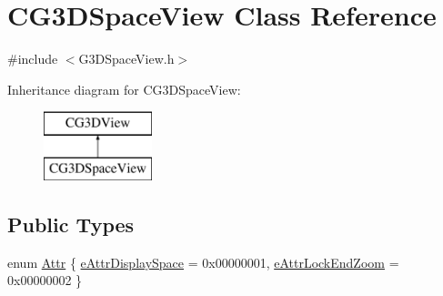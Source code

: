 \hypertarget{class_c_g3_d_space_view}{}\section{C\+G3\+D\+Space\+View Class Reference}
\label{class_c_g3_d_space_view}


{\ttfamily \#include $<$G3\+D\+Space\+View.\+h$>$}

Inheritance diagram for C\+G3\+D\+Space\+View\+:\begin{figure}[H]
\begin{center}
\leavevmode
\includegraphics[height=2.000000cm]{class_c_g3_d_space_view}
\end{center}
\end{figure}
\subsection*{Public Types}
\begin{DoxyCompactItemize}
\item 
enum \hyperlink{class_c_g3_d_space_view_a41938b01269706c0aa66a46634d379b0}{Attr} \{ \hyperlink{class_c_g3_d_space_view_a41938b01269706c0aa66a46634d379b0a52b81a23d5a3b83d9b808e23015bb888}{e\+Attr\+Display\+Space} = 0x00000001, 
\hyperlink{class_c_g3_d_space_view_a41938b01269706c0aa66a46634d379b0a919956879c03b94c4717b463671daba9}{e\+Attr\+Lock\+End\+Zoom} = 0x00000002
 \}
\end{DoxyCompactItemize}
